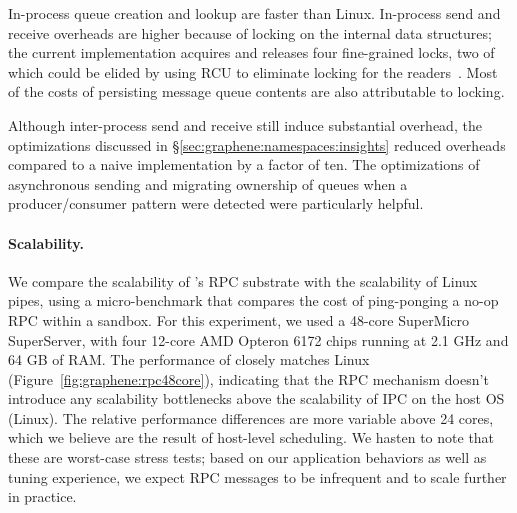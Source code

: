 In-process queue creation and lookup are faster than Linux.
In-process send and receive overheads are higher
because of locking on the internal data structures; the current implementation acquires and releases four
fine-grained locks, two of which could be elided by using RCU to eliminate locking for the readers~\citep{mckenney04rcu}.
Most of the costs of persisting message queue contents are also attributable to locking.

Although inter-process send and receive still induce substantial overhead, the optimizations
discussed in \S\ref{sec:graphene:namespaces:insights} reduced overheads compared to a naive implementation
by a factor of ten.  The optimizations of asynchronous sending and migrating ownership of queues
when a producer/consumer pattern were detected were particularly helpful.

\paragraph{Scalability.}
We compare the scalability of \sysname{}'s RPC substrate with the scalability
of Linux pipes, using a micro-benchmark that compares the cost of ping-ponging a no-op RPC within a sandbox.
For this experiment, we used a 48-core SuperMicro SuperServer, with four 12-core AMD Opteron 6172 chips running at 2.1 GHz and 64 GB of RAM.
The performance of \sysname{} closely matches Linux (Figure~\ref{fig:graphene:rpc48core}),
indicating that the \sysname{} RPC mechanism doesn't introduce any scalability bottlenecks above
the scalability of IPC on the host OS (Linux).
The relative performance differences are more variable above 24 cores, which we believe are the 
result of host-level scheduling.
We hasten to note that these are worst-case stress tests; based on our application behaviors as well as 
tuning experience, we expect RPC messages to be infrequent and to scale further in practice.


